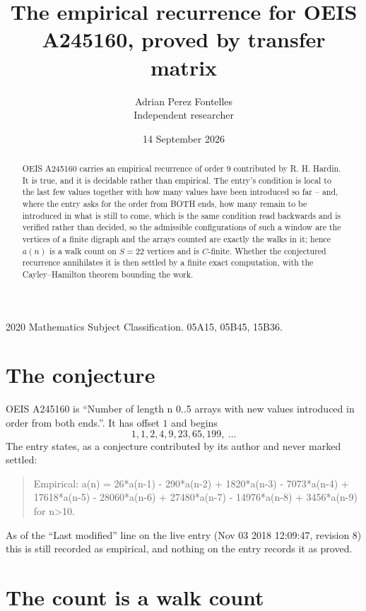 \documentclass[11pt,a4paper]{article}
\title{The empirical recurrence for OEIS A245160, proved by transfer matrix}
\author{Adrian Perez Fontelles\\ \small Independent researcher}
\date{14 September 2026}
\theoremstyle{plain}
\theoremstyle{definition}
\begin{document}
\maketitle

\begin{abstract}
OEIS A245160 carries an empirical recurrence of order $9$ contributed by R. H. Hardin. It is
true, and it is decidable rather than empirical. The entry's condition is local to the last few values together with how many values have been introduced so far -- and, where the entry asks for the order from BOTH ends, how many remain to be introduced in what is still to come, which is the same condition read backwards and is verified rather than decided, so
the admissible configurations of such a window are the vertices of a finite digraph and the
arrays counted are exactly the walks in it; hence $a(n)$ is a walk count on $S=22$ vertices
and is $C$-finite. Whether the conjectured recurrence annihilates it is then settled by a
finite exact computation, with the Cayley--Hamilton theorem bounding the work.
\end{abstract}

\noindent\small 2020 Mathematics Subject Classification. 05A15, 05B45, 15B36.\normalsize

\section{The conjecture}

OEIS A245160 is ``Number of length n 0..5 arrays with new values introduced in order from both ends.''. It has offset $1$ and begins
\[
1, 1, 2, 4, 9, 23, 65, 199,\ \dots
\]
The entry states, as a conjecture contributed by its author and never marked settled:
\begin{quote}
Empirical: a(n) = 26*a(n-1) - 290*a(n-2) + 1820*a(n-3) - 7073*a(n-4) + 17618*a(n-5) - 28060*a(n-6) + 27480*a(n-7) - 14976*a(n-8) + 3456*a(n-9) for n>10.
\end{quote}
As of the ``Last modified'' line on the live entry (Nov 03 2018 12:09:47, revision 8) this is still
recorded as empirical, and nothing on the entry records it as proved.

\section{The count is a walk count}
\end{document}

